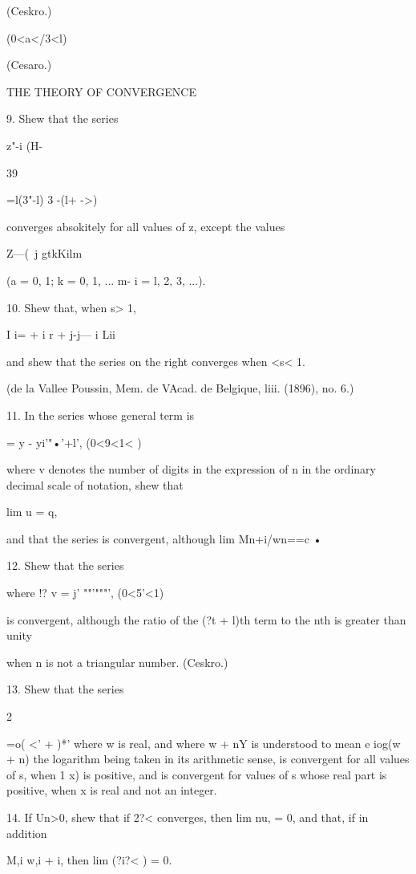 (Ceskro.)

(0<a</3<l)

(Cesaro.)



THE THEORY OF CONVERGENCE

9. Shew that the series

   z"-i (H-%



39



 =l(3"-l) 3 -(l+ ->)

converges absokitely for all values of z, except the values

Z—(\ j gtkKilm

(a = 0, 1; k = 0, 1, ... m-\; i = l, 2, 3, ...).

10. Shew that, when s> 1,

I i= + i r + j-j— i Lii

and shew that the series on the right converges when <s< 1.

(de la Vallee Poussin, Mem. de VAcad. de Belgique, liii. (1896), no.
6.)

11. In the series whose general term is

   = y - yi'"•'+l', (0<9<1< )

where v denotes the number of digits in the expression of n in the
ordinary decimal scale of notation, shew that

lim u = q,

and that the series is convergent, although lim Mn+i/wn==c •

12. Shew that the series

where !? v = j' ""'"""', (0<5'<1)

is convergent, although the ratio of the (?t + l)th term to the nth is
greater than unity

when n is not a triangular number. (Ceskro.)

13. Shew that the series

2

 =o( <' + )*' where w is real, and where w + nY is understood to mean
e iog(w + n) the logarithm being taken in its arithmetic sense, is
convergent for all values of s, when 1 x) is positive, and is
convergent for values of s whose real part is positive, when x is real
and not an integer.

14. If Un>0, shew that if 2?< converges, then lim nu, = 0, and that,
if in addition

M,i w,i + i, then lim (?i?< ) = 0.




